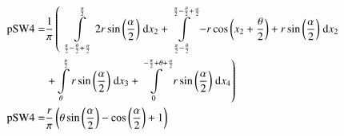 \begin{align}
    \mathrm{pSW4} =&\frac{1}{\pi} \left(\;\;\int\limits_{\frac{\pi}{2} - \frac{\theta}{2} + \frac{\alpha}{2}}^{\frac{\pi}{2}}2 r \sin{\left (\frac{\alpha}{2} \right )}\;\mathrm{d}x_{2}+\int\limits_{\frac{\pi}{2} - \frac{\theta}{2}}^{\frac{\pi}{2} - \frac{\theta}{2} + \frac{\alpha}{2}}- r \cos{\left (x_{2} + \frac{\theta}{2} \right )} + r \sin{\left (\frac{\alpha}{2} \right )}\;\mathrm{d}x_{2}\right.\notag\\
 &\left.+\int\limits_{\theta}^{\frac{\pi}{2}}r \sin{\left (\frac{\alpha}{2} \right )}\;\mathrm{d}x_{3}+\int\limits_{0}^{- \frac{\pi}{2} + \theta + \frac{\alpha}{2}}r \sin{\left (\frac{\alpha}{2} \right )}\;\mathrm{d}x_{4}\right)\label{pSW4Def}\\
    \mathrm{pSW4} =& \frac{r}{\pi} \left(\theta \sin{\left (\frac{\alpha}{2} \right )} - \cos{\left (\frac{\alpha}{2} \right )} + 1\right)\label{pSW4Sln}
\end{align}